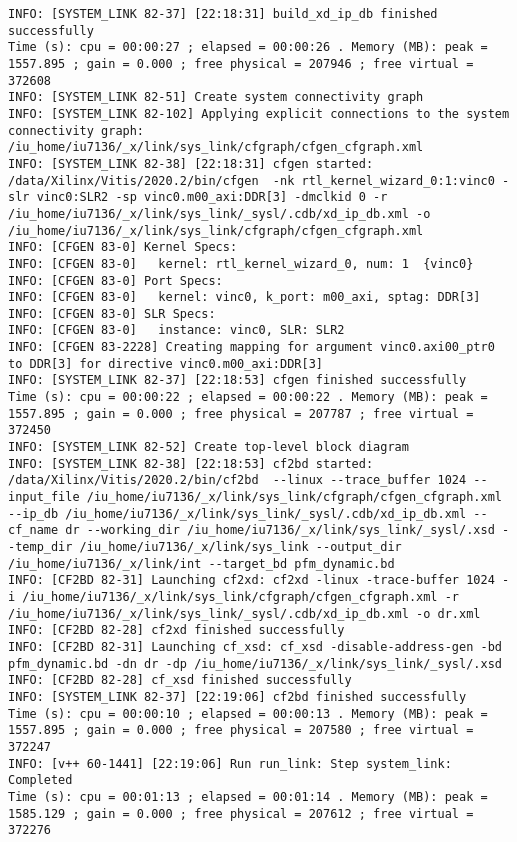 \begin{lstlisting}[label=lst:code_2,caption=Содержимое файла  v++*.log]
INFO: [SYSTEM_LINK 82-37] [22:18:31] build_xd_ip_db finished successfully
Time (s): cpu = 00:00:27 ; elapsed = 00:00:26 . Memory (MB): peak = 1557.895 ; gain = 0.000 ; free physical = 207946 ; free virtual = 372608
INFO: [SYSTEM_LINK 82-51] Create system connectivity graph
INFO: [SYSTEM_LINK 82-102] Applying explicit connections to the system connectivity graph: /iu_home/iu7136/_x/link/sys_link/cfgraph/cfgen_cfgraph.xml
INFO: [SYSTEM_LINK 82-38] [22:18:31] cfgen started: /data/Xilinx/Vitis/2020.2/bin/cfgen  -nk rtl_kernel_wizard_0:1:vinc0 -slr vinc0:SLR2 -sp vinc0.m00_axi:DDR[3] -dmclkid 0 -r /iu_home/iu7136/_x/link/sys_link/_sysl/.cdb/xd_ip_db.xml -o /iu_home/iu7136/_x/link/sys_link/cfgraph/cfgen_cfgraph.xml
INFO: [CFGEN 83-0] Kernel Specs: 
INFO: [CFGEN 83-0]   kernel: rtl_kernel_wizard_0, num: 1  {vinc0}
INFO: [CFGEN 83-0] Port Specs: 
INFO: [CFGEN 83-0]   kernel: vinc0, k_port: m00_axi, sptag: DDR[3]
INFO: [CFGEN 83-0] SLR Specs: 
INFO: [CFGEN 83-0]   instance: vinc0, SLR: SLR2
INFO: [CFGEN 83-2228] Creating mapping for argument vinc0.axi00_ptr0 to DDR[3] for directive vinc0.m00_axi:DDR[3]
INFO: [SYSTEM_LINK 82-37] [22:18:53] cfgen finished successfully
Time (s): cpu = 00:00:22 ; elapsed = 00:00:22 . Memory (MB): peak = 1557.895 ; gain = 0.000 ; free physical = 207787 ; free virtual = 372450
INFO: [SYSTEM_LINK 82-52] Create top-level block diagram
INFO: [SYSTEM_LINK 82-38] [22:18:53] cf2bd started: /data/Xilinx/Vitis/2020.2/bin/cf2bd  --linux --trace_buffer 1024 --input_file /iu_home/iu7136/_x/link/sys_link/cfgraph/cfgen_cfgraph.xml --ip_db /iu_home/iu7136/_x/link/sys_link/_sysl/.cdb/xd_ip_db.xml --cf_name dr --working_dir /iu_home/iu7136/_x/link/sys_link/_sysl/.xsd --temp_dir /iu_home/iu7136/_x/link/sys_link --output_dir /iu_home/iu7136/_x/link/int --target_bd pfm_dynamic.bd
INFO: [CF2BD 82-31] Launching cf2xd: cf2xd -linux -trace-buffer 1024 -i /iu_home/iu7136/_x/link/sys_link/cfgraph/cfgen_cfgraph.xml -r /iu_home/iu7136/_x/link/sys_link/_sysl/.cdb/xd_ip_db.xml -o dr.xml
INFO: [CF2BD 82-28] cf2xd finished successfully
INFO: [CF2BD 82-31] Launching cf_xsd: cf_xsd -disable-address-gen -bd pfm_dynamic.bd -dn dr -dp /iu_home/iu7136/_x/link/sys_link/_sysl/.xsd
INFO: [CF2BD 82-28] cf_xsd finished successfully
INFO: [SYSTEM_LINK 82-37] [22:19:06] cf2bd finished successfully
Time (s): cpu = 00:00:10 ; elapsed = 00:00:13 . Memory (MB): peak = 1557.895 ; gain = 0.000 ; free physical = 207580 ; free virtual = 372247
INFO: [v++ 60-1441] [22:19:06] Run run_link: Step system_link: Completed
Time (s): cpu = 00:01:13 ; elapsed = 00:01:14 . Memory (MB): peak = 1585.129 ; gain = 0.000 ; free physical = 207612 ; free virtual = 372276

\end{lstlisting}
